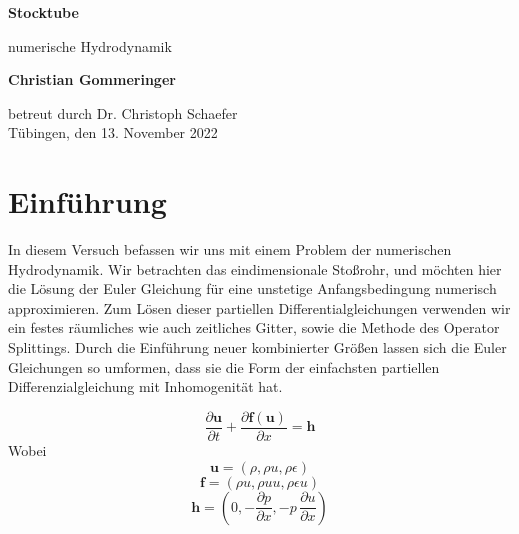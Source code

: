 \documentclass[12pt]{article}
\begin{document}
\begin{titlepage}
    \begin{center}
        \vspace*{1cm}
            
        \Huge
        \textbf{Stocktube}
            
        
        \large
        
            
        \vspace{0.7cm}
            numerische Hydrodynamik
        \vspace{2cm}
        

        \textbf{Christian Gommeringer}
            
        \vspace*{7cm}
        
        
            
        
              
        
            
        
            
        \normalsize
        betreut durch Dr. Christoph Schaefer\\
        \vspace*{1cm}
        Tübingen, den 13. November 2022
        
            
    \end{center}
\end{titlepage}



\section{Einführung}
In diesem Versuch befassen wir uns mit einem Problem der numerischen Hydrodynamik. Wir betrachten das eindimensionale Stoßrohr, und möchten hier die Lösung der  Euler Gleichung für eine unstetige Anfangsbedingung numerisch approximieren. Zum Lösen dieser partiellen Differentialgleichungen verwenden wir ein festes räumliches wie auch zeitliches Gitter, sowie die Methode des Operator Splittings. Durch die Einführung neuer kombinierter Größen lassen sich die Euler Gleichungen so umformen, dass sie die Form der einfachsten partiellen Differenzialgleichung mit Inhomogenität hat.

\begin{equation*}\frac{\partial\textbf{u}}{\partial{t}}+\frac{\partial\textbf{f}(\textbf{u})}{\partial{x}}=\textbf{h}\end{equation*}
Wobei $$\textbf{u}=(\rho,\rho{u},\rho\epsilon)$$
$$\textbf{f}=(\rho{u},\rho{uu},\rho\epsilon{u})$$ 
$$\textbf{h}=\left(0,-\frac{\partial{p}}{\partial{x}},-p\,\frac{\partial{u}}{\partial{x}}\right)$$
\end{document}

